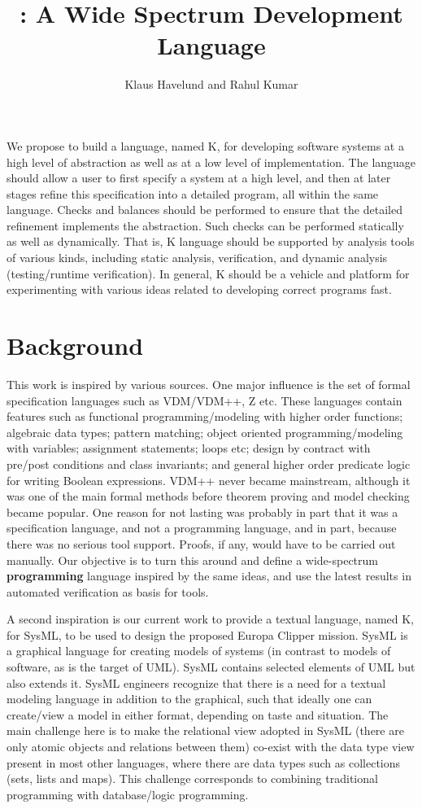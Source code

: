 \documentclass{llncs}
\title{\lang{}: A Wide Spectrum Development Language}
\author{Klaus Havelund and Rahul Kumar}
\institute{
  Jet Propulsion Laboratory\\
  California Institute of Technology\\
  California, USA
}
\newcommand{\lang}{K}
\begin{document}
\maketitle 

We propose to build a language, named \lang{}, for developing software
systems at a high level of abstraction as well as at a low level of
implementation. The language should allow a user to first specify a
system at a high level, and then at later stages refine this
specification into a detailed program, all within the same language.
Checks and balances should be performed to ensure that the detailed
refinement implements the abstraction. Such checks can be performed
statically as well as dynamically. That is, \lang{} language should be
supported by analysis tools of various kinds, including static
analysis, verification, and dynamic analysis (testing/runtime
verification). In general, \lang{} should be a vehicle and platform
for experimenting with various ideas related to developing correct
programs fast.


\section{Background}
This work is inspired by various sources. One major influence is the
set of formal specification languages such as VDM/VDM++, Z etc. These
languages contain features such as functional programming/modeling
with higher order functions; algebraic data types; pattern matching;
object oriented programming/modeling with variables; assignment
statements; loops etc; design by contract with pre/post conditions and
class invariants; and general higher order predicate logic for writing
Boolean expressions. VDM++ never became mainstream, although it was
one of the main formal methods before theorem proving and model
checking became popular.  One reason for not lasting was probably in
part that it was a specification language, and not a programming
language, and in part, because there was no serious tool
support. Proofs, if any, would have to be carried out manually.  Our
objective is to turn this around and define a wide-spectrum {\bf
  programming} language inspired by the same ideas, and use the latest
results in automated verification as basis for tools.

A second inspiration is our current work to provide a textual
language, named K, for SysML, to be used to design the proposed
Europa Clipper mission. SysML is a graphical language for creating
models of systems (in contrast to models of software, as is the target
of UML). SysML contains selected elements of UML but also extends
it. SysML engineers recognize that there is a need for a textual
modeling language in addition to the graphical, such that ideally one
can create/view a model in either format, depending on taste and
situation. The main challenge here is to make the relational view
adopted in SysML (there are only atomic objects and relations between
them) co-exist with the data type view present in most other
languages, where there are data types such as collections (sets, lists
and maps). This challenge corresponds to combining traditional
programming with database/logic programming.
\end{document}
